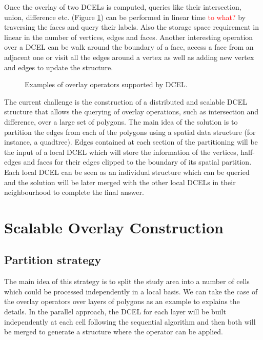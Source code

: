 Once the overlay of two DCELs is computed, queries like their intersection, union, difference etc. (Figure \ref{fig:overlay_operations}) can be performed in linear time \textcolor{red}{to what?} by traversing the faces and query their labels.  Also the storage space requirement in linear in the number of vertices, edges and faces.  Another interesting operation over a DCEL can be walk around the boundary of a face, access a face from an adjacent one or visit all the edges around a vertex as well as adding new vertex and edges to update the structure.

\begin{figure}
    \centering
    
    \caption{Examples of overlay operators supported by DCEL.}\label{fig:overlay_operations}
\end{figure}

The current challenge is the construction of a distributed and scalable DCEL structure that allows the querying of overlay operations, such as intersection and difference, over a large set of polygons.  The main idea of the solution is to partition the edges from each of the polygons using a spatial data structure (for instance, a quadtree).  Edges contained at each section of the partitioning will be the input of a local DCEL which will store the information of the vertices, half-edges and faces for their edges clipped to the boundary of its spatial partition.  Each local DCEL can be seen as an individual structure which can be queried and the solution will be later merged with the other local DCELs in their neighbourhood to complete the final answer. 

\section{Scalable Overlay Construction} \label{sec:methods}

\subsection{Partition strategy} \label{sec:strategy}
The main idea of this strategy is to split the study area into a number of cells which could be processed independently in a local basis. We can take the case of the overlay operators over layers of polygons as an example to explains the details. In the parallel approach, the DCEL for each layer will be built independently at each cell following the sequential algorithm and then both will be merged to generate a structure where the operator can be applied.  


